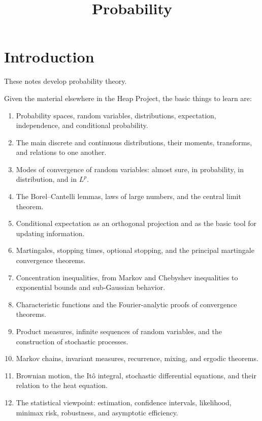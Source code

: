 



\title{Probability}
\maketitle

\label{section-phantom}

\tableofcontents

\section{Introduction}
\label{section-introduction}

\noindent
These notes develop probability theory.

Given the material elsewhere in the Heap
Project, the basic things to learn are:

\begin{enumerate}
\item Probability spaces, random variables,
distributions, expectation, independence,
and conditional probability.

\item The main discrete and continuous
distributions, their moments, transforms,
and relations to one another.

\item Modes of convergence of random
variables: almost sure, in probability,
in distribution, and in $L^p$.

\item The Borel--Cantelli lemmas, laws of
large numbers, and the central limit
theorem.

\item Conditional expectation as an
orthogonal projection and as the basic
tool for updating information.

\item Martingales, stopping times, optional
stopping, and the principal martingale
convergence theorems.

\item Concentration inequalities, from
Markov and Chebyshev inequalities to
exponential bounds and sub-Gaussian
behavior.

\item Characteristic functions and the
Fourier-analytic proofs of convergence
theorems.

\item Product measures, infinite sequences
of random variables, and the construction
of stochastic processes.

\item Markov chains, invariant measures,
recurrence, mixing, and ergodic theorems.

\item Brownian motion, the It\^o integral,
stochastic differential equations, and
their relation to the heat equation.

\item The statistical viewpoint:
estimation, confidence intervals,
likelihood, minimax risk, robustness, and
asymptotic efficiency.
\end{enumerate}

